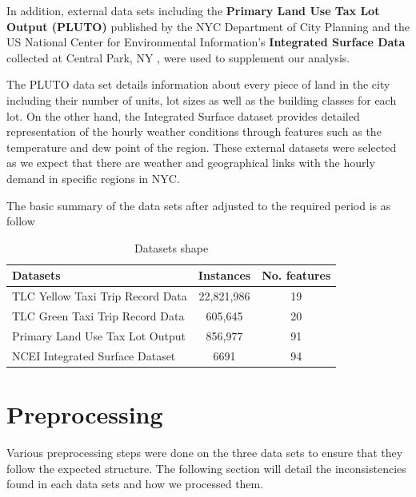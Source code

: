\documentclass[11pt]{article}
\begin{document}
In addition, external data sets including the \textbf{Primary Land Use Tax Lot Output (PLUTO)} published by the NYC Department of City Planning \cite{plutodata} and the US National Center for Environmental Information's \textbf{Integrated Surface Data} collected at Central Park, NY \cite{noaadata}, were used to supplement our analysis. 

The PLUTO data set details information about every piece of land in the city including their number of units, lot sizes as well as the building classes for each lot. On the other hand, the Integrated Surface dataset provides detailed representation of the hourly weather conditions through features such as the temperature and dew point of the region. These external datasets were selected as we expect that there are weather and geographical links with the hourly demand in specific regions in NYC. 

The basic summary of the data sets after adjusted to the required period is as follow


\begin{table}[h]
\begin{center}
    \begin{tabular}{lcc}
        \toprule
        \bf Datasets & \bf Instances & \bf No. features\vspace{0.1mm}\\
        \hline
        \vspace{-0.1mm}TLC Yellow Taxi Trip Record Data & 22,821,986 & 19\vspace{0.1mm}\\
        \hline
        \vspace{-0.1mm}TLC Green Taxi Trip Record Data & 605,645 & 20\vspace{0.1mm}\\
        \hline
        \vspace{-0.1mm}Primary Land Use Tax Lot Output& 856,977 & 91\vspace{0.1mm}\\
        \hline
        \vspace{-0.1mm}NCEI Integrated Surface Dataset & 6691 & 94\\
        \bottomrule
    \end{tabular}
    \caption{Datasets shape}
    \end{center}
\end{table}
\vspace{-3mm}
\section{Preprocessing}
Various preprocessing steps were done on the three data sets to ensure that they follow the expected structure. The following section will detail the inconsistencies found in each data sets and how we processed them.
\end{document}
